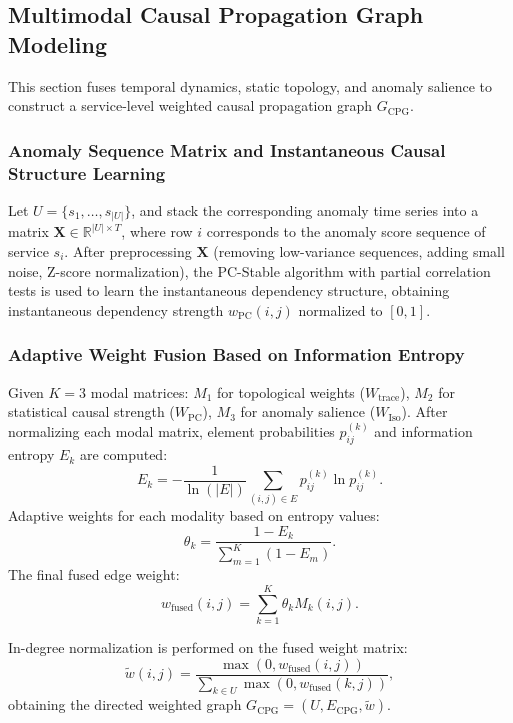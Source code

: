 \documentclass[conference]{IEEEtran}
\begin{document}
\subsection{Multimodal Causal Propagation Graph Modeling}

This section fuses temporal dynamics, static topology, and anomaly salience to construct a service-level weighted causal propagation graph $G_{\text{CPG}}$.

\subsubsection{Anomaly Sequence Matrix and Instantaneous Causal Structure Learning}

Let $U = \{s_1,\ldots,s_{|U|}\}$, and stack the corresponding anomaly time series into a matrix $\mathbf{X} \in \mathbb{R}^{|U| \times T}$, where row $i$ corresponds to the anomaly score sequence of service $s_i$. After preprocessing $\mathbf{X}$ (removing low-variance sequences, adding small noise, Z-score normalization), the PC-Stable \cite{pcstable} algorithm with partial correlation tests is used to learn the instantaneous dependency structure, obtaining instantaneous dependency strength $w_{\text{PC}}(i,j)$ normalized to $[0,1]$.

\subsubsection{Adaptive Weight Fusion Based on Information Entropy}

Given $K=3$ modal matrices: $M_1$ for topological weights ($W_{\text{trace}}$), $M_2$ for statistical causal strength ($W_{\text{PC}}$), $M_3$ for anomaly salience ($W_{\text{Iso}}$). After normalizing each modal matrix, element probabilities $p_{ij}^{(k)}$ and information entropy $E_k$ are computed:
\begin{equation}
E_k = - \frac{1}{\ln(|E|)} \sum_{(i,j) \in E} p_{ij}^{(k)} \ln p_{ij}^{(k)}.
\end{equation}
Adaptive weights for each modality based on entropy values:
\begin{equation}
\theta_k = \frac{1 - E_k}{\sum_{m=1}^{K} (1 - E_m)}.
\end{equation}
The final fused edge weight:
\begin{equation}
w_{\text{fused}}(i,j) = \sum_{k=1}^{K} \theta_k M_k(i,j).
\end{equation}

In-degree normalization is performed on the fused weight matrix:
\begin{equation}
\tilde{w}(i,j) = \frac{\max(0, w_{\text{fused}}(i,j))}{\sum_{k\in U} \max(0, w_{\text{fused}}(k,j))},
\end{equation}
obtaining the directed weighted graph $G_{\text{CPG}} = (U, E_{\text{CPG}}, \tilde{w})$.
\end{document}
